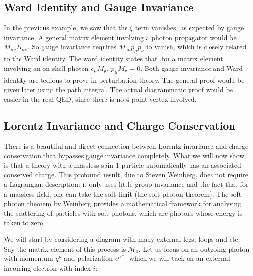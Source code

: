 \documentclass[11pt]{article}
\theoremstyle{definition}
\begin{document}
\subsection{Ward Identity and Gauge Invariance}
In the previous example, we saw that the $\xi$ term vanishes, as expected by gauge invariance. A general matrix element involving a photon propagator would be $M_{\mu\nu}\Pi_{\mu\nu}$. So gauge invariance requires $M_{\mu\nu}p_\mu p_\nu$ to vanish, which is closely related to the Ward identity. The ward identity states that ,for a matrix element involving an on-shell photon $\epsilon_\mu M_\mu$, $p_\mu M_\mu = 0$. Both gauge invariance and Ward identity are tedious to prove in perturbation theory. The general proof would be given later using the path integral. The actual diagrammatic proof would be easier in the real QED, since there is no 4-point vertex involved.

\subsection{Lorentz Invariance and Charge Conservation}
There is a beautiful and direct connection between Lorentz invariance and charge conservation that bypasses gauge invariance completely. What we will now show is that a theory with a massless spin-1 particle automatically has an associated conserved charge. This profound result, due to Steven Weinberg, does not require a Lagrangian description: it only uses little-group invariance and the fact that for a massless field, one can take the soft limit (the soft photon theorem). The soft-photon theorem by Weinberg provides a mathematical framework for analysing the scattering of particles with soft photons, which are photons whose energy is taken to zero.

We will start by considering a diagram with many external legs, loops and etc. Say the matrix element of this process is $\mathcal{M}_0$. Let us focus on an outgoing photon with momentum $q^\mu$ and polarization $\epsilon^{\mu*}$, which we will tack on an external incoming electron with index $i$:
\end{document}
